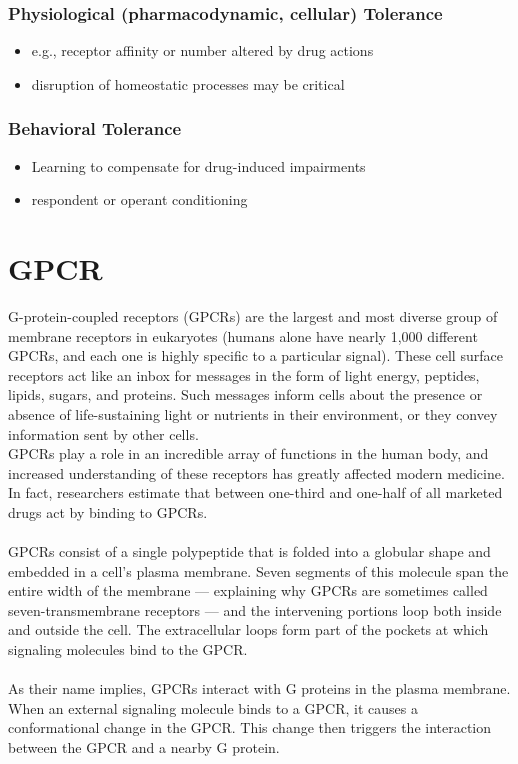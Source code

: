 \documentclass{book}
\begin{document}
\subsubsection{Physiological (pharmacodynamic, cellular) Tolerance}
\begin{itemize}
    \item e.g., receptor affinity or number altered by drug actions
    \item disruption of homeostatic processes may be critical
\end{itemize}

\subsubsection{Behavioral Tolerance}
\begin{itemize}
    \item Learning to compensate for drug-induced impairments
    \item respondent or operant conditioning
\end{itemize}

\section{GPCR}
G-protein-coupled receptors (GPCRs) are the largest and most diverse group of membrane receptors in eukaryotes (humans alone have nearly 1,000 different GPCRs, and each one is highly specific to a particular signal). 
These cell surface receptors act like an inbox for messages in the form of light energy, peptides, lipids, sugars, and proteins. 
Such messages inform cells about the presence or absence of life-sustaining light or nutrients in their environment, or they convey information sent by other cells.
\\
GPCRs play a role in an incredible array of functions in the human body, and increased understanding of these receptors has greatly affected modern medicine. 
In fact, researchers estimate that between one-third and one-half of all marketed drugs act by binding to GPCRs.
\\
\\
GPCRs consist of a single polypeptide that is folded into a globular shape and embedded in a cell's plasma membrane. 
Seven segments of this molecule span the entire width of the membrane — explaining why GPCRs are sometimes called seven-transmembrane receptors — and the intervening portions loop both inside and outside the cell. 
The extracellular loops form part of the pockets at which signaling molecules bind to the GPCR.
\\
\\
As their name implies, GPCRs interact with G proteins in the plasma membrane. 
When an external signaling molecule binds to a GPCR, it causes a conformational change in the GPCR. 
This change then triggers the interaction between the GPCR and a nearby G protein.
\end{document}
